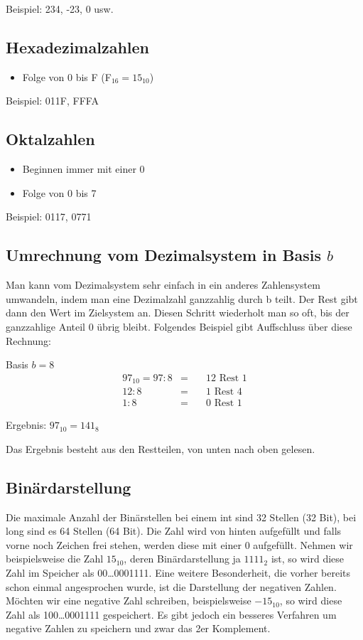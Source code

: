 Beispiel: 234, -23, 0 usw.

\subsection{Hexadezimalzahlen}

\begin{itemize}
\item Folge von 0 bis F (F$_{16} = 15_{10}$)
\end{itemize}

Beispiel: 011F, FFFA

\subsection{Oktalzahlen}

\begin{itemize}
\item Beginnen immer mit einer 0
\item Folge von 0 bis 7
\end{itemize}

Beispiel: 0117, 0771

\subsection{Umrechnung vom Dezimalsystem in Basis $b$}

Man kann vom Dezimalsystem sehr einfach in ein anderes Zahlensystem umwandeln, indem man eine Dezimalzahl ganzzahlig durch b teilt. Der Rest gibt dann den Wert im Zielsystem an. Diesen Schritt wiederholt man so oft, bis der ganzzahlige Anteil 0 übrig bleibt. Folgendes Beispiel gibt Auffschluss über diese Rechnung:

Basis $b = 8$
\begin{eqnarray}
97_{10} = 97 : 8 & = & \quad\text{12 Rest 1}\\
12 : 8 & = & \quad\text{1 Rest 4}\\
1 : 8 & = & \quad\text{0 Rest 1}
\end{eqnarray}

Ergebnis: $97_{10} = 141_{8}$

Das Ergebnis besteht aus den Restteilen, von unten nach oben gelesen. 

\subsection{Binärdarstellung}

Die maximale Anzahl der Binärstellen bei einem int sind 32 Stellen (32 Bit), bei long sind es 64 Stellen (64 Bit). Die Zahl wird von hinten aufgefüllt und falls vorne noch Zeichen frei stehen, werden diese mit einer 0 aufgefüllt. Nehmen wir beispielsweise die Zahl $15_{10}$, deren Binärdarstellung ja $1111_{2}$ ist, so wird diese Zahl im Speicher als 00\dots0001111. Eine weitere Besonderheit, die vorher bereits schon einmal angesprochen wurde, ist die Darstellung der negativen Zahlen. Möchten wir eine negative Zahl schreiben, beispielsweise $-15_{10}$, so wird diese Zahl als 100\dots0001111 gespeichert. Es gibt jedoch ein besseres Verfahren um negative Zahlen zu speichern und zwar das 2er Komplement.

